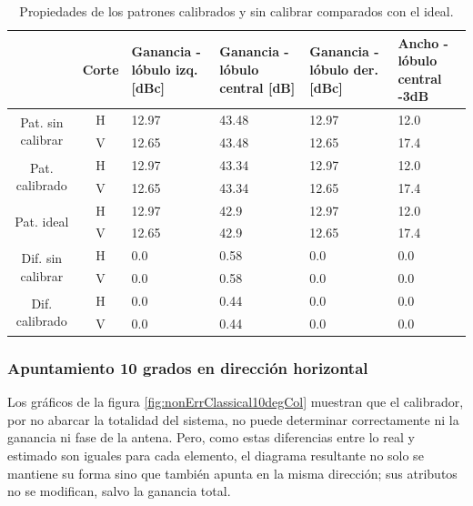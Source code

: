 \begin{table}[H]
  \footnotesize
  \centering
  \begin{tabular}{|c|c|p{2cm}|p{2.5cm}|p{2.5cm}|p{2.5cm}|}
    \cline{2-6}
    \multicolumn{1}{c|}{} & Corte & Ganancia - lóbulo izq. [dBc] & Ganancia - lóbulo central [dB] &
    Ganancia - lóbulo der. [dBc] & Ancho - lóbulo central -3dB \tabularnewline\hline
    \multirow{2}{2cm}{Pat. sin calibrar} & H & 12.97 & 43.48 & 12.97 & 12.0 \tabularnewline\cline{2-6}
     & V & 12.65 & 43.48 & 12.65 & 17.4 \tabularnewline\hline
    \multirow{2}{2cm}{Pat. calibrado} & H & 12.97 & 43.34 & 12.97 & 12.0 \tabularnewline\cline{2-6}
     & V & 12.65 & 43.34 & 12.65 & 17.4 \tabularnewline\hline
    \multirow{2}{2cm}{Pat. ideal} & H & 12.97 & 42.9 & 12.97 & 12.0 \tabularnewline\cline{2-6}
     & V & 12.65 & 42.9 & 12.65 & 17.4 \tabularnewline\hline
    \multirow{2}{2cm}{Dif. sin calibrar} & H & 0.0 & 0.58 & 0.0 & 0.0\tabularnewline\cline{2-6}
     & V & 0.0 & 0.58 & 0.0 & 0.0 \tabularnewline\hline
    \multirow{2}{2cm}{Dif. calibrado} & H & 0.0 & 0.44 & 0.0 & 0.0 \tabularnewline\cline{2-6}
     & V & 0.0 & 0.44 & 0.0 & 0.0 \tabularnewline\hline
  \end{tabular}
  \caption{Propiedades de los patrones calibrados y sin calibrar comparados con el ideal.}
  \label{tab:nonErrClassical0deg}
\end{table}

\subsubsection{Apuntamiento 10 grados en dirección horizontal}

Los gráficos de la figura \ref{fig:nonErrClassical10degCol} muestran que el calibrador, por no abarcar la totalidad del sistema,
no puede determinar correctamente ni la ganancia ni fase de la antena. Pero, como estas diferencias entre lo real y estimado son
iguales para cada elemento, el diagrama resultante no solo se mantiene su forma sino que también apunta en la misma dirección; 
sus atributos no se modifican, salvo la ganancia total.

